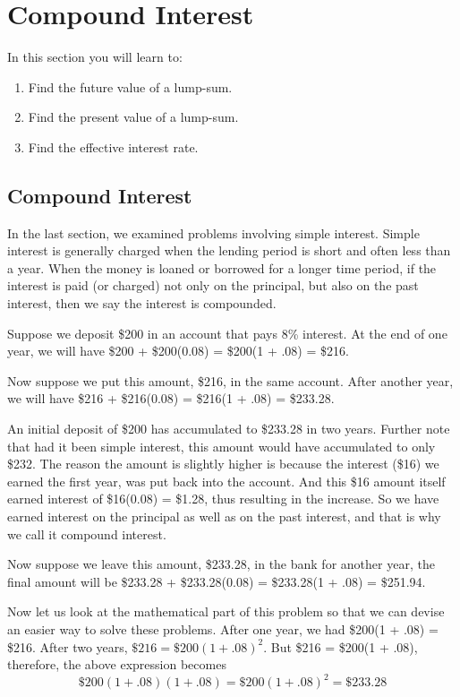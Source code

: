 \section{Compound Interest}\label{section_compound_interest}

In this section you will learn to:
\begin{enumerate}
    \item Find the future value of a lump-sum.
    \item Find the present value of a lump-sum.
    \item Find the effective interest rate.
\end{enumerate}

\subsection{Compound Interest}
In the last section, we examined problems involving simple interest. Simple interest is generally charged when the lending period is short and often less than a year. When the money is loaned or borrowed for a longer time period, if the interest is paid (or charged) not only on the principal, but also on the past interest, then we say the interest is compounded.

Suppose we deposit \$200 in an account that pays 8\% interest. At the end of one year, we will have \$200 + \$200(0.08) = \$200(1 + .08) = \$216.

Now suppose we put this amount, \$216, in the same account. After another year, we will have \$216 + \$216(0.08) = \$216(1 + .08) = \$233.28.

An initial deposit of \$200 has accumulated to \$233.28 in two years. Further note that had it been simple interest, this amount would have accumulated to only \$232. The reason the amount is slightly higher is because the interest (\$16) we earned the first year, was put back into the account. And this \$16 amount itself earned interest of \$16(0.08) = \$1.28, thus resulting in the increase. So we have earned interest on the principal as well as on the past interest, and that is why we call it compound interest.

Now suppose we leave this amount, \$233.28, in the bank for another year, the final amount will be \$233.28 + \$233.28(0.08) = \$233.28(1 + .08) = \$251.94.

Now let us look at the mathematical part of this problem so that we can devise an easier way to solve these problems. After one year, we had \$200(1 + .08) = \$216.
After two years, $\$216 = \$200(1 + .08)^2$.
But \$216 = \$200(1 + .08), therefore, the above expression becomes
\[ \$200(1+.08)(1+.08) = \$200(1+.08)^2=\$233.28 \]

